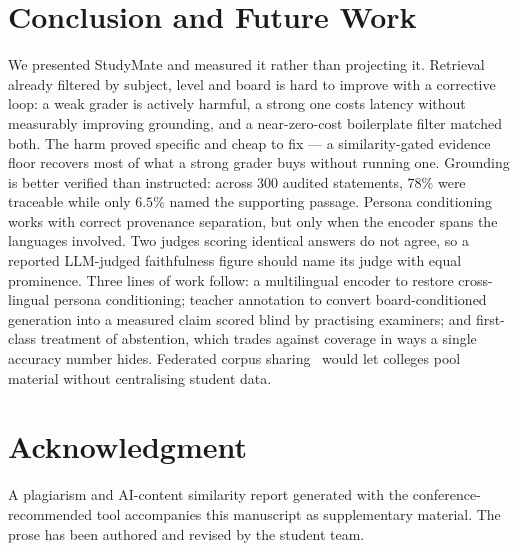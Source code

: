 \documentclass[conference]{IEEEtran}
\begin{document}
\section{Conclusion and Future Work}
We presented StudyMate and measured it rather than projecting it. Retrieval
already filtered by subject, level and board is hard to improve with a
corrective loop: a weak grader is actively harmful, a strong one costs latency
without measurably improving grounding, and a near-zero-cost boilerplate filter
matched both. The harm proved specific and cheap to fix --- a similarity-gated
evidence floor recovers most of what a strong grader buys without running one.
Grounding is better verified than instructed: across $300$ audited statements,
$78\%$ were traceable while only $6.5\%$ named the supporting passage. Persona
conditioning works with correct provenance separation, but only when the encoder
spans the languages involved. Two judges scoring identical answers do not agree,
so a reported LLM-judged faithfulness figure should name its judge with equal
prominence. Three lines of work follow: a multilingual encoder to restore
cross-lingual persona conditioning; teacher annotation to convert
board-conditioned generation into a measured claim scored blind by practising
examiners; and first-class treatment of abstention, which trades against
coverage in ways a single accuracy number hides. Federated corpus
sharing~\cite{fajardo2025} would let colleges pool material without centralising
student data.

\section*{Acknowledgment}
A plagiarism and AI-content similarity report generated with the
conference-recommended tool accompanies this manuscript as supplementary
material. The prose has been authored and revised by the student team.
\end{document}
